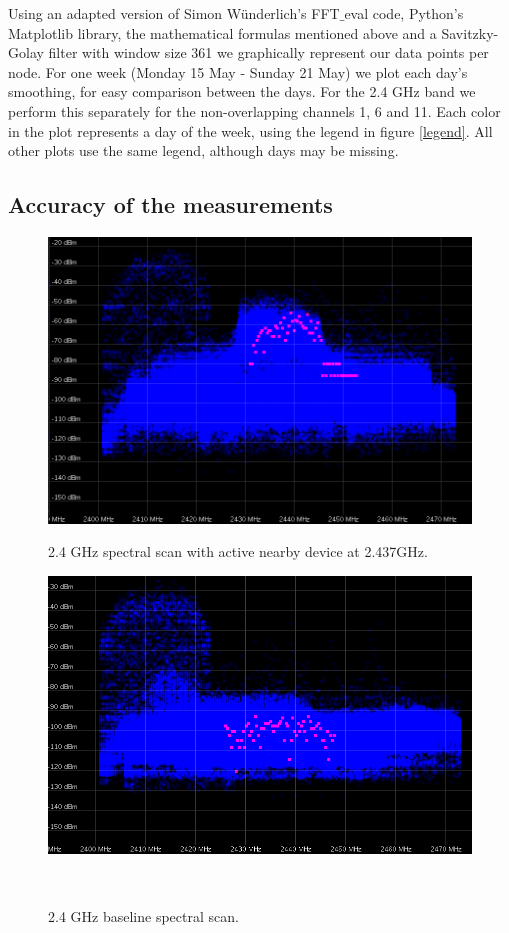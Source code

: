 \documentclass[a4paper, 11pt]{article}
\begin{document}
Using an adapted version of Simon W{\"u}nderlich's FFT$\_$eval code, Python's Matplotlib library, the mathematical formulas mentioned above and a Savitzky-Golay filter with window size 361 we graphically represent our data points per node. For one week (Monday 15 May - Sunday 21 May) we plot each day's smoothing, for easy comparison between the days. For the 2.4 GHz band we perform this separately for the non-overlapping channels 1, 6 and 11. Each color in the plot represents a day of the week, using the legend in figure \ref{legend}. All other plots use the same legend, although days may be missing.



\subsection{Accuracy of the measurements} \label{accuracy}

\begin{figure}[ht]
\begin{minipage}[t]{0.45\textwidth}
\centering
\includegraphics[width=\textwidth]{24check.png}
\caption{2.4 GHz spectral scan with active nearby device at 2.437GHz.}
\label{fig_24}
\end{minipage}\hfill
\begin{minipage}[t]{0.45\textwidth}
\centering
\includegraphics[width=\textwidth]{24check_nodata.png}
\caption{2.4 GHz baseline spectral scan.}
\label{fig_24nodata}
\end{minipage}\
\end{figure}
\end{document}
